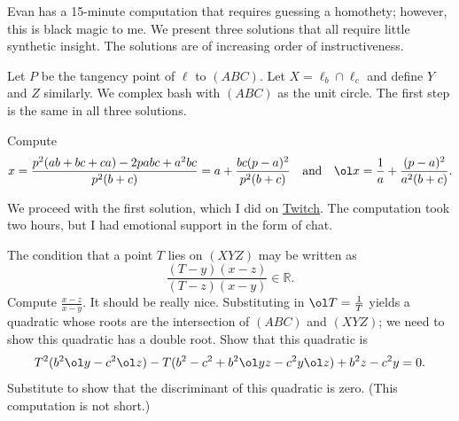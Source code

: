 \documentclass[11pt]{scrartcl}
\begin{document}
\begin{walkthrough}
	Evan has a 15-minute computation that requires guessing a homothety; however, this is black magic to me. We present three solutions that all require little synthetic insight. The solutions are of increasing order of instructiveness.

	Let $P$ be the tangency point of $\ell$ to $(ABC)$. Let $X = \ell_b \cap \ell_c$ and define $Y$ and $Z$ similarly. We complex bash with $(ABC)$ as the unit circle. The first step is the same in all three solutions.
	\begin{walk}
		\ii Compute
		\[x = \frac{p^2(ab + bc + ca) - 2pabc + a^2bc}{p^2(b + c)} = a + \frac{bc(p - a)^2}{p^2(b + c)} \quad \text{and} \quad \ol x = \frac 1a + \frac{(p - a)^2}{a^2(b + c)}.\]
	\end{walk}

	We proceed with the first solution, which I did on \href{https://www.twitch.tv/knowingsanta}{Twitch}. The computation took two hours, but I had emotional support in the form of chat.
	\begin{walk}[resume]
		\ii The condition that a point $T$ lies on $(XYZ)$ may be written as
		\[\frac{(T - y)(x - z)}{(T - z)(x - y)} \in \mathbb R.\]
		Compute $\frac{x - z}{x - y}$. It should be really nice.
		\ii Substituting in $\ol T = \tfrac 1T$ yields a quadratic whose roots are the intersection of $(ABC)$ and $(XYZ)$; we need to show this quadratic has a double root. Show that this quadratic is
		\[T^2(b^2\ol y - c^2\ol z) - T(b^2 - c^2 + b^2\ol yz - c^2y\ol z) + b^2z - c^2y = 0.\]
		\ii Substitute to show that the discriminant of this quadratic is zero. (This computation is not short.)
	\end{walk}
	

\end{walkthrough}
\end{document}
